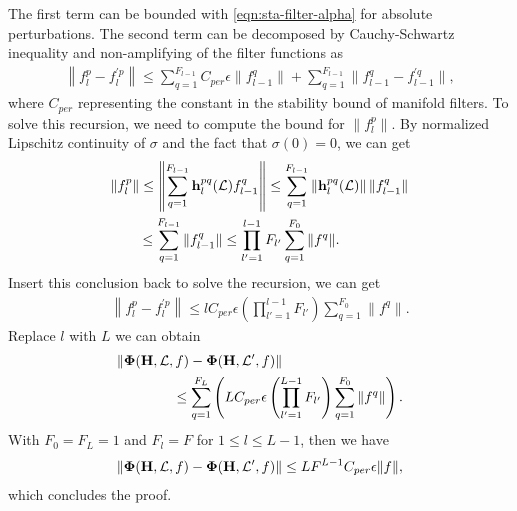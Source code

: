 The first term can be bounded with \eqref{eqn:sta-filter-alpha} for absolute perturbations. The second term can be decomposed by Cauchy-Schwartz inequality and non-amplifying of the filter functions as
 \begin{align}
 \left\| f_{l}^p - f_l^{'p} \right\| \leq \sum_{q=1}^{F_{l-1}} C_{per} \epsilon \| f_{l-1}^q\| + \sum_{q=1}^{F_{l-1}} \| f_{l-1}^q - f_{l-1}^{'q} \|,
 \end{align}
where $C_{per}$ representing the constant in the stability bound of manifold filters. To solve this recursion, we need to compute the bound for $\|f_l^p\|$. By normalized Lipschitz continuity of $\sigma$ and the fact that $\sigma(0)=0$, we can get
 \begin{align}
 \nonumber &\| f_l^p \|\leq \left\| \sum_{q=1}^{F_{l-1}} {\mathbf h}_l^{pq}({\mathcal L}) f_{l-1}^{q}  \right\| \leq  \sum_{q=1}^{F_{l-1}}  \left\| {\mathbf h}_l^{pq}({\mathcal L})\right\|  \|f_{l-1}^{q}  \| \\
 &\qquad \leq   \sum_{q=1}^{F_{l-1}}   \|f_{l-1}^{q}  \| \leq \prod\limits_{l'=1}^{l-1} F_{l'} \sum_{q=1}^{F_0}\| f^q \|.
 \end{align}
 Insert this conclusion back to solve the recursion, we can get
 \begin{align}
 \left\| f_{l}^p - f_l^{'p} \right\| \leq l C_{per}\epsilon \left( \prod\limits_{l'=1}^{l-1} F_{l'} \right) \sum_{q=1}^{F_0} \|f^q\|.
 \end{align}
 Replace $l$ with $L$ we can obtain
 \begin{align}
 &\nonumber \|\bm\Phi({\mathbf H},{\mathcal L},f) - \bm\Phi({\mathbf H},{\mathcal L}',f)\| \\
 &\qquad \qquad \leq \sum_{q=1}^{F_L} \left( L C_{per}\epsilon \left( \prod\limits_{l'=1}^{L-1} F_{l'} \right) \sum_{q=1}^{F_0} \|f^q\| \right).
 \end{align}
 With $F_0=F_L=1$ and $F_l=F$ for $1\leq l\leq L-1$, then we have
  \begin{align}
 \|\bm\Phi({\mathbf H},{\mathcal L},f) - \bm\Phi({\mathbf H},{\mathcal L}',f)\| \leq LF^{L-1} C_{per}\epsilon \|f\|,
 \end{align}
which concludes the proof.
 
 
\setcounter{subsection}{2}
